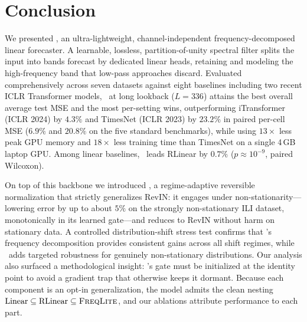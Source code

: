 \section{Conclusion}
\label{sec:conclusion}

We presented \method, an ultra-lightweight, channel-independent
frequency-decomposed linear forecaster. A learnable, lossless,
partition-of-unity spectral filter splits the input into bands forecast by
dedicated linear heads, retaining and modeling the high-frequency band that
low-pass approaches discard. Evaluated comprehensively across seven datasets
against eight baselines including two recent ICLR Transformer models, \method\
at long lookback ($L{=}336$) attains the best overall average test MSE and the
most per-setting wins, outperforming iTransformer (ICLR 2024) by $4.3\%$
and TimesNet (ICLR 2023) by $23.2\%$ in paired per-cell MSE ($6.9\%$ and
$20.8\%$ on the five standard benchmarks), while using $13\times$
less peak GPU memory and $18\times$ less training time than TimesNet on a single
4\,GB laptop GPU. Among linear baselines, \method\ leads RLinear by $0.7\%$
($p \approx 10^{-9}$, paired Wilcoxon).

On top of this backbone we introduced \arevin, a regime-adaptive reversible
normalization that strictly generalizes RevIN: it engages under
non-stationarity---lowering error by up to about $5\%$ on the strongly
non-stationary ILI dataset, monotonically in its learned gate---and reduces to
RevIN without harm on stationary data. A controlled distribution-shift stress
test confirms that \method's frequency decomposition provides consistent gains
across all shift regimes, while \arevin\ adds targeted robustness for genuinely
non-stationary distributions. Our analysis also surfaced a methodological
insight: \arevin's gate must be initialized at the identity point to avoid a
gradient trap that otherwise keeps it dormant. Because each component is an
opt-in generalization, the model admits the clean nesting
$\text{Linear} \subseteq \text{RLinear} \subseteq \textsc{FreqLite}$, and our ablations
attribute performance to each part.

